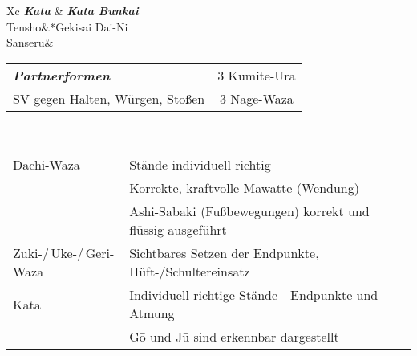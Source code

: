 \begin{tcolorbox}[width=\textwidth,height=\textheight,right=12pt,left=12pt,colframe=BRBELT,colback=white,fonttitle=\bfseries,coltitle=white,title=2. Kyu:\indent Kihon-Ido Kata - Partnerformen - Erwartungshorizont]
\begin{center}
		\begin{minipage}[t]{0.45\textwidth}
			\begin{tabularx}{\textwidth}{Xc}
				\midrule
				\textbf{\textit{Kata}} & \textbf{\textit{Kata Bunkai}} \\
				Tensho&*{Gekisai Dai-Ni}\\
				Sanseru& \\
				\midrule
			\end{tabularx}
		\end{minipage}
		\null\hfill\null	%
		\begin{minipage}[t]{0.45\textwidth}
			\begin{tabularx}{\textwidth}{Xc}
				\midrule
				{\textbf{\textit{Partnerformen}}} & 3 Kumite-Ura\\
				SV gegen Halten, Würgen, Stoßen & 3 Nage-Waza  \\
				\midrule
			\end{tabularx}
		\end{minipage}\\
	\end{center}
	\begin{center}
		{\small 		\begin{tabular}{ll}
				\midrule
				Dachi-Waza	&	Stände individuell richtig \\
				&	Korrekte, kraftvolle Mawatte (Wendung)\\
				&	Ashi-Sabaki (Fußbewegungen) korrekt und flüssig ausgeführt\\
				Zuki-/\,Uke-/\,Geri-Waza	&	Sichtbares Setzen der Endpunkte, Hüft-/Schultereinsatz\\
				Kata		&	Individuell richtige Stände - Endpunkte und Atmung\\
				&	G\={o} und J\={u} sind erkennbar dargestellt\\
				\midrule
		\end{tabular}}
	\end{center}
\end{tcolorbox}	